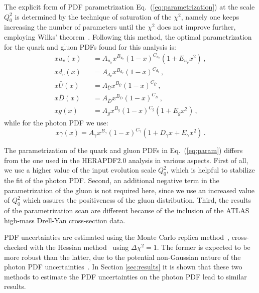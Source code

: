 The explicit form of PDF parametrization Eq.~(\ref{eq:parametrization})
at the scale $Q_0^2$ is determined by the
technique of saturation of the $\chi^{2}$, namely one keeps increasing
the number of parameters until the $\chi^{2}$ does not improve
further, employing Wilks' theorem~\cite{Wilks:1938dza}.
%
Following this method, the optimal parametrization for the quark and
gluon PDFs found for this analysis is:
\begin{eqnarray}
  \nonumber
  xu_v(x) &&= A_{u_v}x^{B_{u_v}}(1-x)^{C_{u_v}}(1+E_{u_v}x^{2})\, , \\
  \nonumber
xd_v(x) &&= A_{d_v}x^{B_{d_v}}(1-x)^{C_{d_v}}\, , \\
x\bar{U}(x) &&= A_{\bar{U}}x^{B_{\bar{U}}}(1-x)^{C_{\bar{U}}}\, , \\
\nonumber
x\bar{D}(x) &&= A_{\bar{D}}x^{B_{\bar{D}}}(1-x)^{C_{\bar{D}}}\, , \\
\nonumber
\label{eq:param}
xg(x) &&= A_{g}x^{B_{g}}(1-x)^{C_{g}}(1+E_{g}x^{2})\, ,
\end{eqnarray}
while for the photon PDF we use:
\begin{equation}
x\gamma(x) = A_{\gamma}x^{B_{\gamma}}(1-x)^{C_{\gamma}}(1+D_{\gamma}x+E_{\gamma}x^{2}) \, .
\end{equation}


The parametrization of the quark and gluon PDFs in
Eq.~(\ref{eq:param}) differs from the one used in the HERAPDF2.0
analysis in various aspects.
%
First of all, we use a higher value of the input evolution scale
$Q_0^2$, which is helpful to stabilize the fit of the photon PDF.
%
Second, an additional negative term in the parametrization of the
gluon is not required here, since we use an increased value of $Q_0^2$
which assures the positiveness of the gluon distribution.
%
Third, the results of the parametrization scan are different because of the
inclusion of the ATLAS high-mass Drell-Yan cross-section data.

PDF uncertainties are estimated using the Monte Carlo replica
method~\cite{DelDebbio:2004xtd,DelDebbio:2007ee,Ball:2008by},
cross-checked with
the Hessian method~\cite{Pumplin:2001ct} using $\Delta\chi^2=1$.
%
The former is expected to be more robust than the latter, due to the
potential non-Gaussian nature of the photon PDF
uncertainties~\cite{Ball:2013hta}.
%
In Section \ref{sec:results} it is shown that these two methods to estimate the PDF uncertainties
on the photon PDF lead to similar results.

